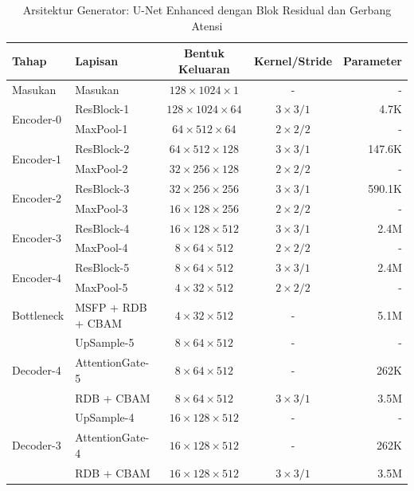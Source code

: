 \documentclass[journal]{IEEEtran}
\begin{document}
\begin{table}[t]
\centering
\caption{Arsitektur Generator: U-Net Enhanced dengan Blok Residual dan Gerbang Atensi}
\label{tab:generator_arch}
\begin{tabular}{|l|l|c|c|r|}
\hline
\textbf{Tahap} & \textbf{Lapisan} & \textbf{Bentuk Keluaran} & \textbf{Kernel/Stride} & \textbf{Parameter} \\
\hline
Masukan & Masukan & $128 \times 1024 \times 1$ & - & - \\
\hline
\multirow{2}{*}{Encoder-0} 
& ResBlock-1 & $128 \times 1024 \times 64$ & $3 \times 3 / 1$ & 4.7K \\
& MaxPool-1 & $64 \times 512 \times 64$ & $2 \times 2 / 2$ & - \\
\hline
\multirow{2}{*}{Encoder-1}
& ResBlock-2 & $64 \times 512 \times 128$ & $3 \times 3 / 1$ & 147.6K \\
& MaxPool-2 & $32 \times 256 \times 128$ & $2 \times 2 / 2$ & - \\
\hline
\multirow{2}{*}{Encoder-2}
& ResBlock-3 & $32 \times 256 \times 256$ & $3 \times 3 / 1$ & 590.1K \\
& MaxPool-3 & $16 \times 128 \times 256$ & $2 \times 2 / 2$ & - \\
\hline
\multirow{2}{*}{Encoder-3}
& ResBlock-4 & $16 \times 128 \times 512$ & $3 \times 3 / 1$ & 2.4M \\
& MaxPool-4 & $8 \times 64 \times 512$ & $2 \times 2 / 2$ & - \\
\hline
\multirow{2}{*}{Encoder-4}
& ResBlock-5 & $8 \times 64 \times 512$ & $3 \times 3 / 1$ & 2.4M \\
& MaxPool-5 & $4 \times 32 \times 512$ & $2 \times 2 / 2$ & - \\
\hline
Bottleneck & MSFP + RDB + CBAM & $4 \times 32 \times 512$ & - & 5.1M \\
\hline
\multirow{3}{*}{Decoder-4}
& UpSample-5 & $8 \times 64 \times 512$ & - & - \\
& AttentionGate-5 & $8 \times 64 \times 512$ & - & 262K \\
& RDB + CBAM & $8 \times 64 \times 512$ & $3 \times 3 / 1$ & 3.5M \\
\hline
\multirow{3}{*}{Decoder-3}
& UpSample-4 & $16 \times 128 \times 512$ & - & - \\
& AttentionGate-4 & $16 \times 128 \times 512$ & - & 262K \\
& RDB + CBAM & $16 \times 128 \times 512$ & $3 \times 3 / 1$ & 3.5M \\
\hline

\end{tabular}
\end{table}
\end{document}
